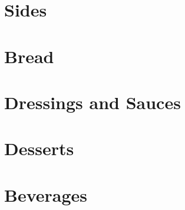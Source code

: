 \documentclass[%
letter,
11pt
]{article}
\begin{document}
\section{Sides}









\section{Bread}













\section{Dressings and Sauces}





\section{Desserts}












\section{Beverages}










\end{document}
